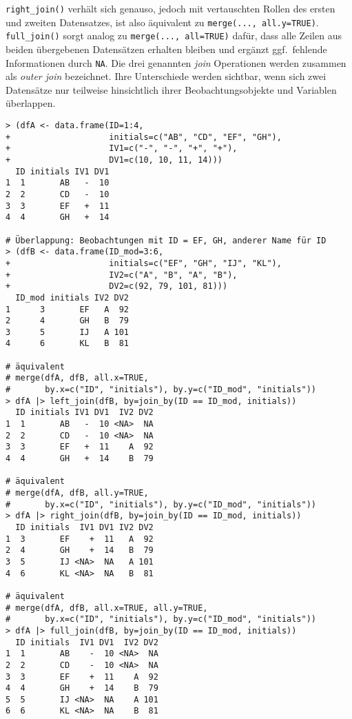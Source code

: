 \lstinline!right_join()! verhält sich genauso, jedoch mit vertauschten Rollen des ersten und zweiten Datensatzes, ist also äquivalent zu \lstinline!merge(..., all.y=TRUE)!. \lstinline!full_join()! sorgt analog zu \lstinline!merge(..., all=TRUE)! dafür, dass alle Zeilen aus beiden übergebenen Datensätzen erhalten bleiben und ergänzt ggf.\ fehlende Informationen durch \lstinline!NA!. Die drei genannten \emph{join} Operationen werden zusammen als \emph{outer join} bezeichnet. Ihre Unterschiede werden sichtbar, wenn sich zwei Datensätze nur teilweise hinsichtlich ihrer Beobachtungsobjekte und Variablen überlappen.
\begin{lstlisting}
> (dfA <- data.frame(ID=1:4,
+                    initials=c("AB", "CD", "EF", "GH"),
+                    IV1=c("-", "-", "+", "+"),
+                    DV1=c(10, 10, 11, 14)))
  ID initials IV1 DV1
1  1       AB   -  10
2  2       CD   -  10
3  3       EF   +  11
4  4       GH   +  14

# Überlappung: Beobachtungen mit ID = EF, GH, anderer Name für ID
> (dfB <- data.frame(ID_mod=3:6,
+                    initials=c("EF", "GH", "IJ", "KL"),
+                    IV2=c("A", "B", "A", "B"),
+                    DV2=c(92, 79, 101, 81)))
  ID_mod initials IV2 DV2
1      3       EF   A  92
2      4       GH   B  79
3      5       IJ   A 101
4      6       KL   B  81

# äquivalent
# merge(dfA, dfB, all.x=TRUE,
#       by.x=c("ID", "initials"), by.y=c("ID_mod", "initials"))
> dfA |> left_join(dfB, by=join_by(ID == ID_mod, initials))
  ID initials IV1 DV1  IV2 DV2
1  1       AB   -  10 <NA>  NA
2  2       CD   -  10 <NA>  NA
3  3       EF   +  11    A  92
4  4       GH   +  14    B  79

# äquivalent
# merge(dfA, dfB, all.y=TRUE,
#       by.x=c("ID", "initials"), by.y=c("ID_mod", "initials"))
> dfA |> right_join(dfB, by=join_by(ID == ID_mod, initials))
  ID initials  IV1 DV1 IV2 DV2
1  3       EF    +  11   A  92
2  4       GH    +  14   B  79
3  5       IJ <NA>  NA   A 101
4  6       KL <NA>  NA   B  81

# äquivalent
# merge(dfA, dfB, all.x=TRUE, all.y=TRUE,
#       by.x=c("ID", "initials"), by.y=c("ID_mod", "initials"))
> dfA |> full_join(dfB, by=join_by(ID == ID_mod, initials))
  ID initials  IV1 DV1  IV2 DV2
1  1       AB    -  10 <NA>  NA
2  2       CD    -  10 <NA>  NA
3  3       EF    +  11    A  92
4  4       GH    +  14    B  79
5  5       IJ <NA>  NA    A 101
6  6       KL <NA>  NA    B  81
\end{lstlisting}

